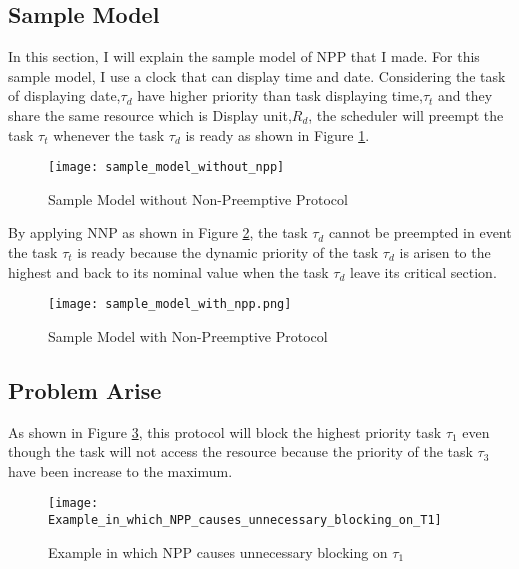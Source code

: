 \subsection{Sample Model}

In this section, I will explain the sample model of NPP that I made. For this sample model, I use a clock that can display time and date. Considering the task of displaying date,$\tau_{d}$ have higher priority than task displaying time,$\tau_{t}$ and they share the same resource which is Display unit,$R_{d}$, the scheduler will preempt the task $\tau_{t}$ whenever the task $\tau_{d}$ is ready as shown in Figure \ref{fig:sample_model_without_npp}.
\begin{figure}[ht]
    \centering
    \texttt{[image: sample\_model\_without\_npp]}
    \caption{Sample Model without Non-Preemptive Protocol} \cite{b6}
    \label{fig:sample_model_without_npp}
\end{figure}

By applying NNP as shown in Figure \ref{fig:sample_model_with_npp}, the task $\tau_{d}$ cannot be preempted in event the task $\tau_{t}$ is ready because the dynamic priority of the task $\tau_{d}$ is arisen to the highest and back to its nominal value when the task $\tau_{d}$ leave its critical section. 


\begin{figure}[ht]
    \centering
    \texttt{[image: sample\_model\_with\_npp.png]}
    \caption{Sample Model with Non-Preemptive Protocol }
    \label{fig:sample_model_with_npp}
\end{figure}


\subsection{Problem Arise}

As shown in Figure \ref{fig:Example_in_which_NPP_causes_unnecessary_blocking_on_T1}, this protocol will block the highest priority task $ \tau_{1} $ even though the task will not access the resource because the priority of the task $\tau_{3}$ have been increase to the maximum.

\begin{figure}[ht]
    \centering
    \texttt{[image: Example\_in\_which\_NPP\_causes\_unnecessary\_blocking\_on\_T1]}
    \caption{Example in which NPP causes unnecessary blocking on $ \tau_{1} $ \cite{b5}}
    \label{fig:Example_in_which_NPP_causes_unnecessary_blocking_on_T1}
\end{figure}

